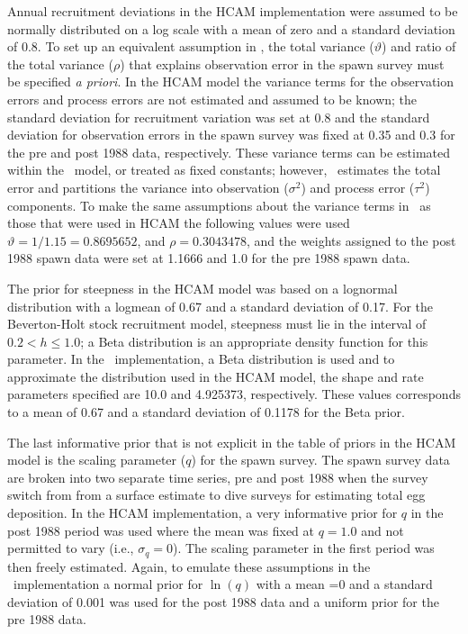 Annual recruitment deviations in the HCAM implementation were assumed to be normally distributed on a log scale with a mean of zero and a standard deviation of 0.8.  To set up an equivalent assumption in \iscam, the total variance ($\vartheta$) and ratio of the total variance ($\rho$) that explains observation error in the spawn survey must be specified \emph{a priori}. In the HCAM model the variance terms for the observation errors and process errors are not estimated and assumed to be known; the standard deviation for recruitment variation was set at 0.8 and the standard deviation for observation errors in the spawn survey was fixed at 0.35 and 0.3 for the pre and post 1988 data, respectively.  These variance terms can be estimated within the \iscam\ model, or treated as fixed constants; however, \iscam\ estimates the total error and partitions the variance into observation ($\sigma^2$) and process error ($\tau^2$) components.  To make the same assumptions about the variance terms in \iscam\ as those that were used in HCAM the following values were used $\vartheta=1/1.15=0.8695652$, and $\rho=0.3043478$, and the weights assigned to the post 1988 spawn data were set at 1.1666 and 1.0 for the pre 1988 spawn data.

The prior for steepness in the HCAM model was based on a lognormal distribution with a logmean of 0.67 and a standard deviation of 0.17.  For the Beverton-Holt stock recruitment model, steepness must lie in the interval of  $0.2<h\leq1.0$; a Beta distribution is an appropriate density function for this parameter. In the \iscam\ implementation, a Beta distribution is used and to approximate the distribution used in the HCAM model, the shape and rate parameters specified are 10.0 and 4.925373, respectively.  These values corresponds to a mean of 0.67 and a standard deviation of 0.1178 for the Beta prior.

The last informative prior that is not explicit in the table of priors in the HCAM model is the scaling parameter ($q$) for the spawn survey.  The spawn survey data are broken into two separate time series, pre and post 1988 when the survey switch from from a surface estimate to dive surveys for estimating total egg deposition.  In the HCAM implementation, a very informative prior for $q$ in the post 1988 period was used where the mean was fixed at $q=1.0$ and not permitted to vary (i.e., $\sigma_q=0$).  The scaling parameter in the first period was then freely estimated. Again, to emulate these assumptions in the \iscam\ implementation a normal prior for $\ln(q)$ with a mean =0 and a standard deviation of 0.001 was used for the post 1988 data and a uniform prior for the pre 1988 data.

